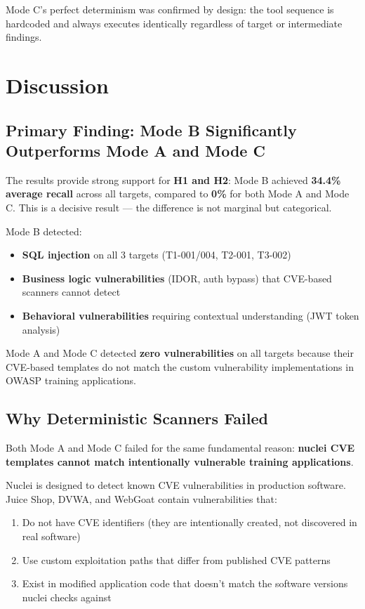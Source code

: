\documentclass[12pt,a4paper,oneside]{book}
\begin{document}
Mode C's perfect determinism was confirmed by design: the tool sequence is hardcoded and always executes identically regardless of target or intermediate findings.

\chapter{Discussion}

\section{Primary Finding: Mode B Significantly Outperforms Mode A and Mode C}

The results provide strong support for \textbf{H1 and H2}: Mode B achieved \textbf{34.4\% average recall} across all targets, compared to \textbf{0\%} for both Mode A and Mode C. This is a decisive result — the difference is not marginal but categorical.

Mode B detected:
\begin{itemize}
    \item \textbf{SQL injection} on all 3 targets (T1-001/004, T2-001, T3-002)
    \item \textbf{Business logic vulnerabilities} (IDOR, auth bypass) that CVE-based scanners cannot detect
    \item \textbf{Behavioral vulnerabilities} requiring contextual understanding (JWT token analysis)
\end{itemize}

Mode A and Mode C detected \textbf{zero vulnerabilities} on all targets because their CVE-based templates do not match the custom vulnerability implementations in OWASP training applications.

\section{Why Deterministic Scanners Failed}

Both Mode A and Mode C failed for the same fundamental reason: \textbf{nuclei CVE templates cannot match intentionally vulnerable training applications}. 

Nuclei is designed to detect known CVE vulnerabilities in production software. Juice Shop, DVWA, and WebGoat contain vulnerabilities that:
\begin{enumerate}
    \item Do not have CVE identifiers (they are intentionally created, not discovered in real software)
    \item Use custom exploitation paths that differ from published CVE patterns
    \item Exist in modified application code that doesn't match the software versions nuclei checks against
\end{enumerate}
\end{document}
